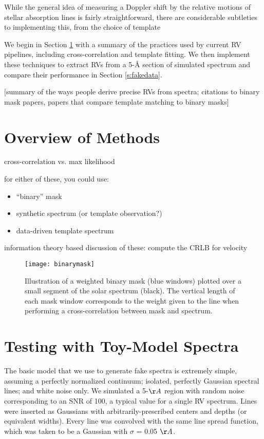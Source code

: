 \documentclass[modern]{aastex61}
\begin{document}
While the general idea of measuring a Doppler shift by the relative motions of stellar absorption lines is fairly straightforward, there are considerable subtleties to implementing this, from the choice of template 

We begin in Section \ref{s:methods} with a summary of the practices used by current RV pipelines, including cross-correlation and template fitting. We then implement these techniques to extract RVs from a 5-\r{A} section of simulated spectrum and compare their performance in Section \ref{s:fakedata}. 

[summary of the ways people derive precise RVs from spectra; citations to binary mask papers, papers that compare template matching to binary masks]

\section{Overview of Methods}
\label{s:methods}

cross-correlation vs. max likelihood

for either of these, you could use:
\begin{itemize}
\item ``binary'' mask
\item synthetic spectrum (or template observation?)
\item data-driven template spectrum
\end{itemize}

information theory based discussion of these: compute the CRLB for velocity

\begin{figure}
\centering
\texttt{[image: binarymask]}
\caption{Illustration of a weighted binary mask (blue windows) plotted over a small segment of the solar spectrum (black). The vertical length of each mask window corresponds to the weight given to the line when performing a cross-correlation between mask and spectrum.}
\label{fig:binarymask}
\end{figure}


\section{Testing with Toy-Model Spectra}

The basic model that we use to generate fake spectra is extremely simple, assuming a perfectly normalized continuum; isolated, perfectly Gaussian spectral lines; and white noise only. We simulated a 5-$\AA$ region with random noise corresponding to an SNR of 100, a typical value for a single RV spectrum. Lines were inserted as Gaussians with arbitrarily-prescribed centers and depths (or equivalent widths). Every line was convolved with the same line spread function, which was taken to be a Gaussian with $\sigma$ = 0.05 $\AA$. %
\end{document}
